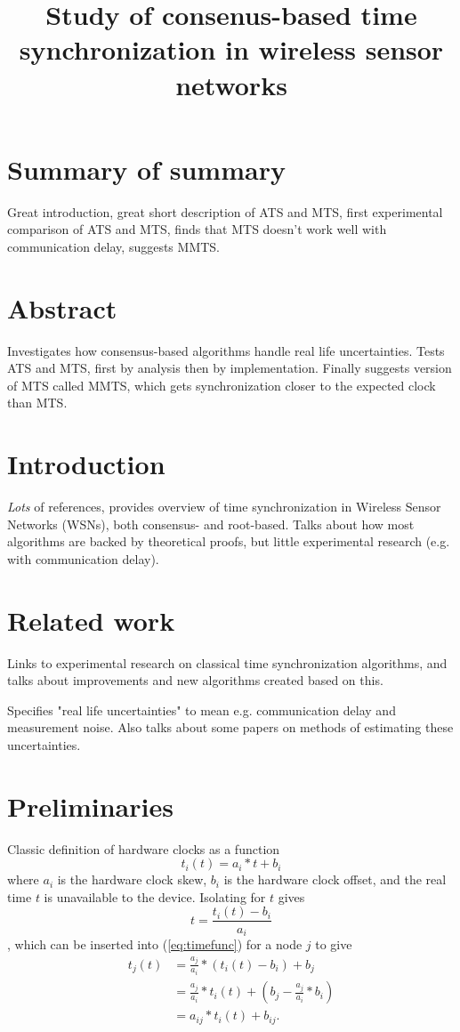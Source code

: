 \documentclass{article}
\title{Study of consenus-based time synchronization in wireless sensor networks}
\begin{document}
\maketitle
\section{Summary of summary}
Great introduction, great short description of ATS and MTS, first experimental comparison of ATS and MTS, finds that MTS doesn't work well with communication delay, suggests MMTS.

\section{Abstract}
Investigates how consensus-based algorithms handle real life uncertainties. Tests ATS and MTS, first by analysis then by implementation. Finally suggests version of MTS called MMTS, which gets synchronization closer to the expected clock than MTS.

\section{Introduction}
\textit{Lots} of references, provides overview of time synchronization in Wireless Sensor Networks (WSNs), both consensus- and root-based. Talks about how most algorithms are backed by theoretical proofs, but little experimental research (e.g. with communication delay).

\section{Related work}
Links to experimental research on classical time synchronization algorithms, and talks about improvements and new algorithms created based on this.

Specifies "real life uncertainties" to mean e.g. communication delay and measurement noise. Also talks about some papers on methods of estimating these uncertainties.

\section{Preliminaries}
Classic definition of hardware clocks as a function
\begin{equation} \label{eq:timefunc}
    t_i(t) = a_i * t + b_i
\end{equation}
where $a_i$ is the hardware clock skew, $b_i$ is the hardware clock offset, and the real time $t$ is unavailable to the device. Isolating for $t$ gives
    $$ t = \frac{t_i(t) - b_i}{a_i} $$,
which can be inserted into (\ref{eq:timefunc}) for a node $j$ to give
\begin{align}
    t_j(t) &= \frac{a_j}{a_i} * (t_i(t) - b_i) + b_j \nonumber \\
        &= \frac{a_j}{a_i} * t_i(t) + (b_j - \frac{a_j}{a_i} * b_i) \nonumber \\ 
        &= a_{ij} * t_i(t) + b_{ij}. \label{eq:timefunc2}
\end{align}
\end{document}

